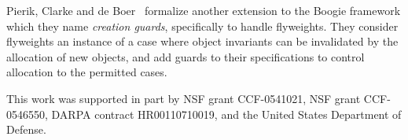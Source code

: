 \documentclass[preprint,natbib]{sigplanconf}
\begin{document}
Pierik, Clarke and de Boer~\cite{creational-invariants} formalize another
extension to the Boogie framework which they name \emph{creation
  guards}, specifically to handle flyweights. They consider flyweights
an instance of a case where object invariants can be invalidated by
the allocation of new objects, and add guards to their specifications
to control allocation to the permitted cases. 





\acks

This work was supported in part by NSF grant
CCF-0541021, NSF grant CCF-0546550, DARPA contract HR00110710019, and
the United States Department of Defense.





% 
% 
% 
% 
\end{document}
